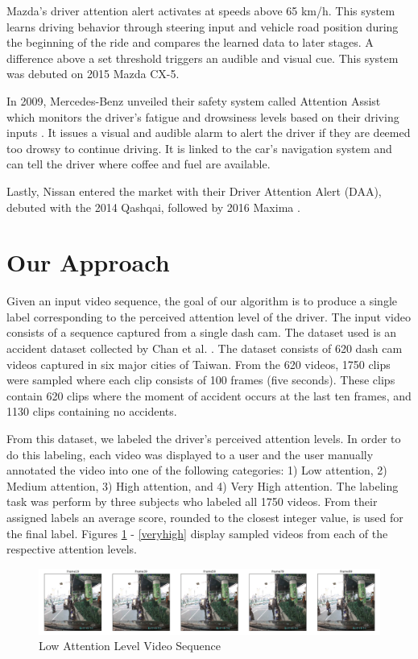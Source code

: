 \documentclass[10pt, conference, compsocconf]{IEEEtran}
\begin{document}
Mazda's driver attention alert activates at speeds above 65 km/h. This system learns driving behavior through steering input and vehicle road position during the beginning of the ride and compares the learned data to later stages. A difference above a set threshold triggers an audible and visual cue. This system was debuted on 2015 Mazda CX-5.

In 2009, Mercedes-Benz unveiled their safety system called Attention Assist which monitors the driver's fatigue and drowsiness levels based on their driving inputs \cite{benz}. It issues a visual and audible alarm to alert the driver if they are deemed too drowsy to continue driving. It is linked to the car's navigation system and can tell the driver where coffee and fuel are available.

Lastly, Nissan entered the market with their Driver Attention Alert (DAA), debuted with the 2014 Qashqai, followed by 2016 Maxima \cite{nissan}.

\section{Our Approach}
Given an input video sequence, the goal of our algorithm is to produce a single label corresponding to the perceived attention level of the driver. The input video consists of a sequence captured from a single dash cam. The dataset used is an accident dataset collected by Chan et al. \cite{10.1007/978-3-319-54190-7_9}. The dataset consists of 620 dash cam videos captured in six major cities of Taiwan. From the 620 videos, 1750 clips were sampled where each clip consists of 100 frames (five seconds). These clips contain 620 clips where the moment of accident occurs at the last ten frames, and 1130 clips containing no accidents.

From this dataset, we labeled the driver's perceived attention levels. In order to do this labeling, each video was displayed to a user and the user manually annotated the video into one of the following categories: 1) Low attention, 2) Medium attention, 3) High attention, and 4) Very High attention. The labeling task was perform by three subjects who labeled all 1750 videos. From their assigned labels an average score, rounded to the closest integer value, is used for the final label. Figures \ref{low} - \ref{veryhigh} display sampled videos from each of the respective attention levels.

\begin{figure}[!t]
\centering
\includegraphics[width=6.5in]{images/level1}
\caption{Low Attention Level Video Sequence}
\label{low}
\end{figure}
\end{document}
